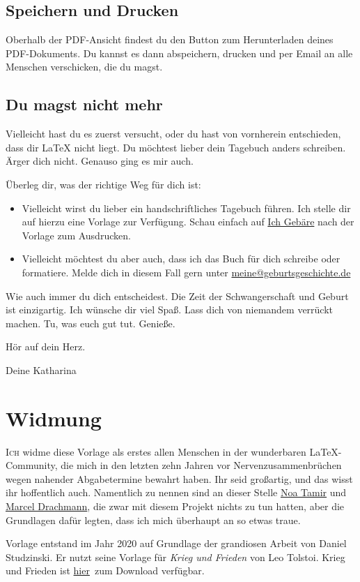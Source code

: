 \section{Speichern und Drucken}
Oberhalb der PDF-Ansicht findest du den Button zum Herunterladen deines PDF-Dokuments. Du kannst es dann abspeichern, drucken und per Email an alle Menschen verschicken, die du magst.

\section{Du magst nicht mehr}
Vielleicht hast du es zuerst versucht, oder du hast von vornherein entschieden, dass dir \LaTeX{} nicht liegt. Du möchtest lieber dein Tagebuch anders schreiben. Ärger dich nicht. Genauso ging es mir auch.\newline

Überleg dir, was der richtige Weg für dich ist:
\begin{itemize}
    \item Vielleicht wirst du lieber ein handschriftliches Tagebuch führen. Ich stelle dir auf hierzu eine Vorlage zur Verfügung. Schau einfach auf \href{www.ichgebaere.com/schwangerschaftstagebuch}{Ich Gebäre} nach der Vorlage zum Ausdrucken.
    \item Vielleicht möchtest du aber auch, dass ich das Buch für dich schreibe oder formatiere. Melde dich in diesem Fall gern unter \href{mailto:meine@geburtsgeschichte.de}{meine@geburtsgeschichte.de}
\end{itemize}

Wie auch immer du dich entscheidest. Die Zeit der Schwangerschaft und Geburt ist einzigartig. Ich wünsche dir viel Spaß. Lass dich von niemandem verrückt machen. Tu, was euch gut tut. Genieße. \newline

Hör auf dein Herz.\newline

{\LARGE{\calli Deine Katharina}}

\chapter*{Widmung}


\lettrine[lines=2, loversize=0.3, lraise=0]{\initfamily I}{ch} widme diese Vorlage als erstes allen Menschen in der wunderbaren LaTeX-Community, die mich in den letzten zehn Jahren vor Nervenzusammenbrüchen wegen nahender Abgabetermine bewahrt haben. Ihr seid großartig, und das wisst ihr hoffentlich auch. Namentlich zu nennen sind an dieser Stelle \href{http://www.noatamir.com/}{Noa Tamir} und \href{https://www.zib.de/de/members/drachmann}{Marcel Drachmann}, die zwar mit diesem Projekt nichts zu tun hatten, aber die Grundlagen dafür legten, dass ich mich überhaupt an so etwas traue.

 Vorlage entstand im Jahr 2020 auf Grundlage der grandiosen Arbeit von Daniel Studzinski. Er nutzt seine Vorlage für \emph{Krieg und Frieden} von Leo Tolstoi. Krieg und Frieden ist \href{https://www.overleaf.com/articles/war-and-peace/kdgcwgqzrrfd}{hier}\ zum Download verfügbar. \
